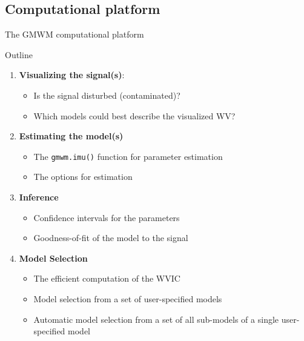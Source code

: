 \documentclass[envcountsect,usenames,dvipsnames]{beamer}
\theoremstyle{mystyle}
\begin{document}
\subsection{Computational platform}
\begin{frame}{The GMWM computational platform}

\begin{block}{Outline}

\begin{enumerate}
    \item \textbf{Visualizing the signal(s)}: 
    \begin{itemize}
        \item Is the signal disturbed (contaminated)?
        \item Which models could best describe the visualized WV?
    \end{itemize}
    \item \textbf{Estimating the model(s)}
    \begin{itemize}
        \item The {\tt gmwm.imu()} function for parameter estimation
        \item The options for estimation
    \end{itemize}
    \item \textbf{Inference}
    \begin{itemize}
        \item Confidence intervals for the parameters
        \item Goodness-of-fit of the model to the signal
    \end{itemize}
    \item \textbf{Model Selection}
    \begin{itemize}
        \item The efficient computation of the WVIC
        \item Model selection from a set of user-specified models
        \item Automatic model selection from a set of all sub-models of a single user-specified model
    \end{itemize}
\end{enumerate}
\end{block}

\end{frame}
\end{document}
